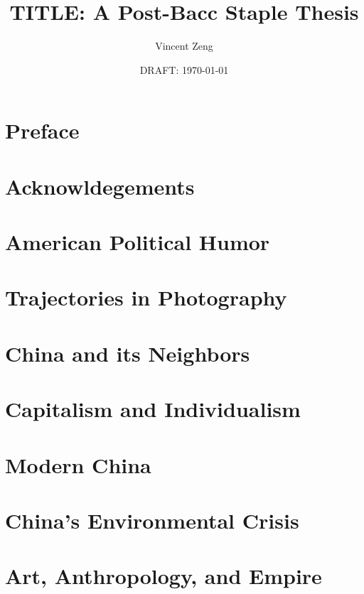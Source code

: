 \documentclass{book}[10pt,letterpaper,openany]
\begin{document}
\title{TITLE: A Post-Bacc Staple Thesis}
\author{Vincent Zeng}
\date{DRAFT: \today}

\frontmatter

\maketitle
\tableofcontents

\chapter{Preface}


\chapter{Acknowldegements}



\mainmatter

\chapter{American Political Humor}


\chapter{Trajectories in Photography}


\chapter{China and its Neighbors}


\chapter{Capitalism and Individualism}


\chapter{Modern China}

\chapter{China's Environmental Crisis}

\chapter{Art, Anthropology, and Empire}
\end{document}
